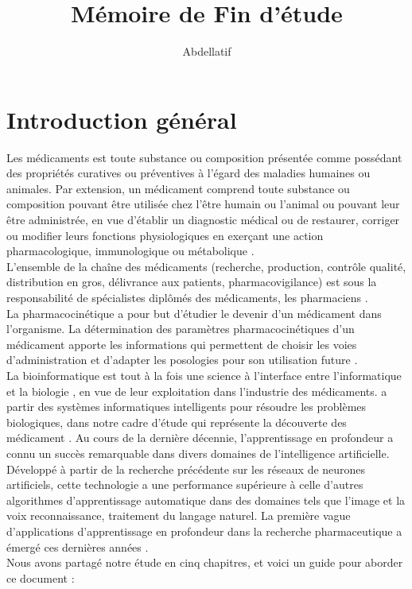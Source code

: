 \documentclass[12pt]{report}
\title{Mémoire de Fin d'étude}
\author{Abdellatif}
\begin{document}
\section*{Introduction général}
Les médicaments est toute substance ou composition présentée comme possédant des propriétés curatives ou préventives à l'égard des maladies humaines ou animales. Par extension, un médicament comprend toute substance ou composition pouvant être utilisée chez l'être humain ou l'animal ou pouvant leur être administrée, en vue d'établir un diagnostic médical ou de restaurer, corriger ou modifier leurs fonctions physiologiques en exerçant une action pharmacologique, immunologique ou métabolique \cite{ref} .\\
L'ensemble de la chaîne des médicaments (recherche, production, contrôle qualité, distribution en gros, délivrance aux patients, pharmacovigilance) est sous la responsabilité de spécialistes diplômés des médicaments, les pharmaciens \cite{ref2}.\\
La pharmacocinétique  a pour but d'étudier le devenir d'un médicament dans l'organisme. La détermination des paramètres pharmacocinétiques d'un médicament apporte les informations qui permettent de choisir les voies d'administration et d'adapter les posologies pour son utilisation future \cite{ref3}. \\ La bioinformatique est tout à la fois une science à l'interface entre l'informatique et la biologie , en vue de leur exploitation dans l'industrie des médicaments. a partir des systèmes informatiques intelligents pour résoudre les problèmes biologiques, dans notre cadre d'étude  qui représente la découverte des médicament .
Au cours de la dernière décennie, l'apprentissage en profondeur a connu un succès remarquable dans divers domaines de l'intelligence artificielle.
Développé à partir de la recherche précédente sur les réseaux de neurones artificiels,
cette technologie a une performance supérieure à celle d'autres algorithmes d'apprentissage automatique dans des domaines tels que l'image et la voix reconnaissance, traitement du langage naturel. La première vague d'applications d'apprentissage en profondeur dans la recherche pharmaceutique a émergé ces dernières années \cite{ref4} . \\
Nous avons partagé notre étude en cinq chapitres, et voici un guide pour aborder ce document :\\
\end{document}
